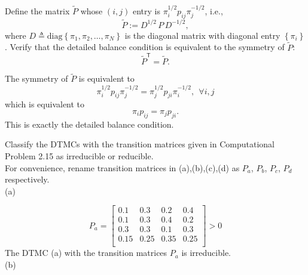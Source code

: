 \documentclass[  11pt]{article}
\newcommand{\set}[1]{\left\{#1\right\}}
\newcommand{\tr}{{\textsf{T}}}
\begin{document}
\begin{ExerciseList}
\Exercise



Define  the matrix $\tilde{P}$ whose $(i,j)$ entry is 
 $\pi_i^{1/2}p_{ij}\pi_j^{-1/2}$, i.e.,
 $$ {\tilde{P}:=D^{1/2}\, P\, D^{-1/2}}, $$
 where  $D\triangleq \mbox{diag}\set{\pi_1,\pi_2,\ldots,\pi_N}$  is the diagonal matrix
 with diagonal entry $\set{\pi_i}$.
 Verify that  the detailed balance condition is equivalent to   the symmetry of $\tilde{P}$:
\[ {\tilde{P} ^\tr = \tilde{P}}.\]


\Answer The symmetry of $\tilde{P}$ is equivalent to 
\[  \pi_i^{1/2}p_{ij}\pi_j^{-1/2} 
 = \pi_j^{1/2}p_{ji}\pi_i^{-1/2} , ~~\forall i,j \]
 which is equivalent to 
\[  \pi_i p_{ij}  
 = \pi_j p_{ji} .\]
This is exactly the detailed balance condition.

 
 \Exercise[origin={p55, 2.19}] Classify the DTMCs with the transition matrices given in Computational
Problem 2.15 as irreducible or reducible.\\

\Answer
For convenience, rename transition matrices in (a),(b),(c),(d) as $P_a$, $P_b$, $P_c$, $P_d$ respectively.\\
(a)\par
\[
P_a=\begin{bmatrix}
   0.1&0.3&0.2 &0.4\\
   0.1&0.3&0.4&0.2\\
   0.3&0.3&0.1&0.3\\
   0.15&0.25&0.35&0.25\\

\end{bmatrix} > 0
\]
The DTMC (a) with the transition matrices $P_a$ is irreducible.\\

(b)\begin{center}
\end{center}
\end{ExerciseList}
\end{document}
